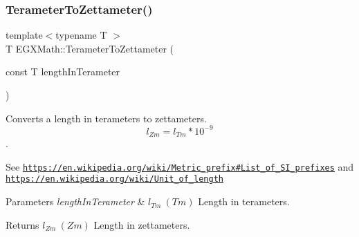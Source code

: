 \subsubsection{\texorpdfstring{Terameter\+To\+Zettameter()}{TerameterToZettameter()}}
{\footnotesize\ttfamily template$<$typename T $>$ \\
T E\+G\+X\+Math\+::\+Terameter\+To\+Zettameter (\begin{DoxyParamCaption}\item[{const T}]{length\+In\+Terameter }\end{DoxyParamCaption})}



Converts a length in terameters to zettameters. \[ l_{Zm}=l_{Tm} * 10^{-9} \]. 

See \href{https://en.wikipedia.org/wiki/Metric_prefix#List_of_SI_prefixes}{\tt https\+://en.\+wikipedia.\+org/wiki/\+Metric\+\_\+prefix\#\+List\+\_\+of\+\_\+\+S\+I\+\_\+prefixes} and \href{https://en.wikipedia.org/wiki/Unit_of_length}{\tt https\+://en.\+wikipedia.\+org/wiki/\+Unit\+\_\+of\+\_\+length} 
\begin{DoxyParams}{Parameters}
{\em length\+In\+Terameter} & $ l_{Tm}\ (Tm)$ Length in terameters. \\
\hline
\end{DoxyParams}
\begin{DoxyReturn}{Returns}
$ l_{Zm}\ (Zm)$ Length in zettameters. 
\end{DoxyReturn}
